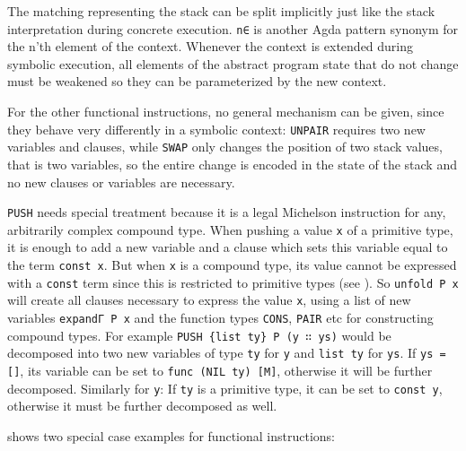The matching representing the stack can be split implicitly
just like the stack interpretation during concrete execution.
\verb/n∈/ is another Agda pattern synonym for the n'th element of the context.
Whenever the context is extended during symbolic execution, all elements of the abstract
program state that do not change must be weakened so they can be parameterized by the new context.

For the other functional instructions, no general mechanism can be given,
since they behave very differently in a symbolic context:
\verb/UNPAIR/ requires two new variables and clauses, while
\verb/SWAP/ only changes the position of two stack values, that is two variables,
so the entire change is encoded in the state of the stack
and no new clauses or variables are necessary.

\verb/PUSH/ needs special treatment because it is a legal Michelson instruction
for any, arbitrarily complex compound type.
When pushing a value \verb/x/ of a primitive type, it is enough to add a new variable
and a clause which sets this variable equal to the term \verb/const x/.
But when \verb/x/ is a compound type, its value cannot be expressed with a \verb/const/ term
since this is restricted to primitive types (see ).
So \verb/unfold P x/ will create all clauses necessary
to express the value \verb/x/, using a list of new variables \verb/expandΓ P x/ and the function
types \verb/CONS/, \verb/PAIR/ etc for constructing compound types.
For example \verb/PUSH {list ty} P (y ∷ ys)/ would be decomposed into two new variables of type
\verb/ty/ for \verb/y/ and \verb/list ty/ for \verb/ys/.
If \verb/ys = []/, its variable can be set to \verb/func (NIL ty) [M]/,
otherwise it will be further decomposed.
Similarly for \verb/y/: If \verb/ty/ is a primitive type, it can be set to \verb/const y/,
otherwise it must be further decomposed as well.

 shows two special case examples for functional instructions:

